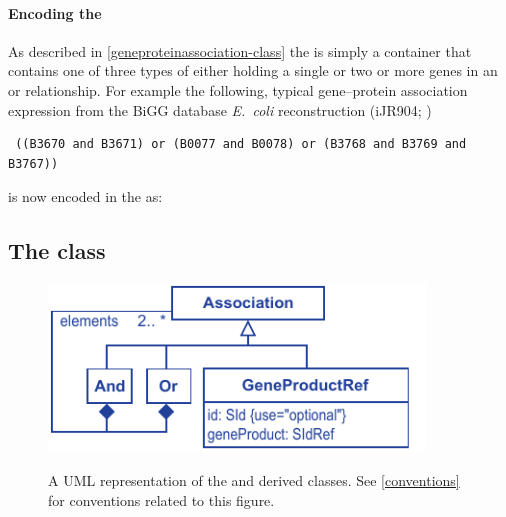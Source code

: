 \paragraph{Encoding the \GeneProteinAssociation}
As described in \ref{geneproteinassociation-class} the \GeneProteinAssociation is simply a container that contains one of three types of \Association either holding a single \GeneProductRef or two or more genes in an \GeneAnd or \GeneOr relationship. For example the following, typical gene--protein association expression from the BiGG database \emph{E.~coli} reconstruction (iJR904; \cite{ijr904, bigg})
%
\begin{verbatim}
 ((B3670 and B3671) or (B0077 and B0078) or (B3768 and B3769 and B3767))
\end{verbatim}
%
is now encoded in the \FBCPackage as:
%
\subsection{The \FBC {} class}
\label{association-class}

%
\begin{figure}[h!]
  \centering
  \includegraphics[width=10cm]{images/v2harmony_fbc_association.pdf}\\
  \caption{A UML representation of the \FBCPackage \Association and derived
	classes. See \ref{conventions} for conventions related to this figure.}
  \label{fig:fbc_uml_ass}
\end{figure}


